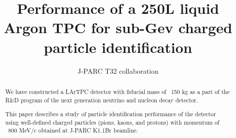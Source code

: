 \documentclass[final,3p,times,twocolumn]{elsarticle}
\begin{document}
\begin{frontmatter}



\title{Performance of a 250L liquid Argon TPC
for sub-Gev charged particle identification}


\author{J-PARC T32 collaboration}

\address{}

\begin{abstract}

We have constructed a LArTPC detector with fiducial mass of ~150 kg
as a part of the R\&D program of the next generation neutrino and nucleon
decay detector.

This paper describes a study of particle identification performance of
the detector using well-defined charged particles
(pions, kaons, and protons) with momentum of ~800 MeV/$c$
obtained at J-PARC K1.1Br beamline.

\end{abstract}

\begin{keyword}


\end{keyword}

\end{frontmatter}

\end{document}
